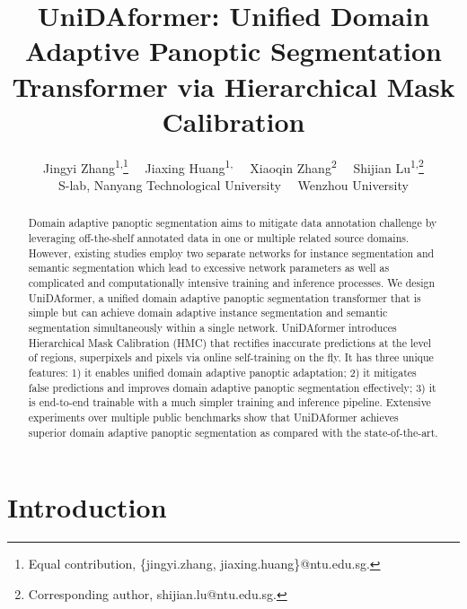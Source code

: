 \documentclass[10pt,twocolumn,letterpaper]{article}
\begin{document}
\title{UniDAformer: Unified Domain Adaptive Panoptic Segmentation Transformer via Hierarchical Mask Calibration}

\author{Jingyi Zhang\textsuperscript{\rm 1,}\thanks{Equal contribution, \{jingyi.zhang, jiaxing.huang\}@ntu.edu.sg.} \ \ Jiaxing Huang\textsuperscript{\rm 1,} \  \  Xiaoqin Zhang\textsuperscript{\rm 2} \ \ Shijian Lu\textsuperscript{\rm 1,}\thanks{Corresponding author, shijian.lu@ntu.edu.sg.} 
\\
 S-lab, Nanyang Technological University \ \   Wenzhou University
\\
}
\maketitle

\begin{abstract}

Domain adaptive panoptic segmentation aims to mitigate data annotation challenge by leveraging off-the-shelf annotated data in one or multiple related source domains. However, existing studies employ two separate networks for instance segmentation and semantic segmentation which lead to excessive network parameters as well as complicated and computationally intensive training and inference processes. We design UniDAformer, a unified domain adaptive panoptic segmentation transformer that is simple but can achieve domain adaptive instance segmentation and semantic segmentation simultaneously within a single network. UniDAformer introduces Hierarchical Mask Calibration (HMC) that rectifies inaccurate predictions at the level of regions, superpixels and pixels via online self-training on the fly. It has three unique features: 1) it enables unified domain adaptive panoptic adaptation; 2) it mitigates false predictions and improves domain adaptive panoptic segmentation effectively; 3) it is end-to-end trainable with a much simpler training and inference pipeline. Extensive experiments over multiple public benchmarks show that UniDAformer achieves superior domain adaptive panoptic segmentation as compared with the state-of-the-art.
\end{abstract}

\section{Introduction}
\end{document}
